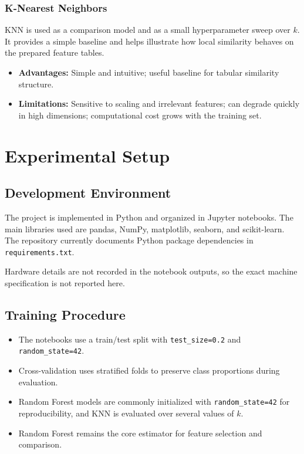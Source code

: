 \documentclass[11pt,a4paper]{article}
\begin{document}
\subsubsection{K-Nearest Neighbors}


KNN is used as a comparison model and as a small hyperparameter sweep over $k$. It provides a simple baseline and helps illustrate how local similarity behaves on the prepared feature tables.

\begin{itemize}[leftmargin=*]
    \item \textbf{Advantages:} Simple and intuitive; useful baseline for tabular similarity structure.
    \item \textbf{Limitations:} Sensitive to scaling and irrelevant features; can degrade quickly in high dimensions; computational cost grows with the training set.
\end{itemize}

\section{Experimental Setup}
\subsection{Development Environment}


The project is implemented in Python and organized in Jupyter notebooks. The main libraries used are pandas, NumPy, matplotlib, seaborn, and scikit-learn. The repository currently documents Python package dependencies in \texttt{requirements.txt}.

Hardware details are not recorded in the notebook outputs, so the exact machine specification is not reported here.

\subsection{Training Procedure}


\begin{itemize}
    \item The notebooks use a train/test split with \texttt{test\_size=0.2} and \texttt{random\_state=42}.
    \item Cross-validation uses stratified folds to preserve class proportions during evaluation.
    \item Random Forest models are commonly initialized with \texttt{random\_state=42} for reproducibility, and KNN is evaluated over several values of $k$.
    \item Random Forest remains the core estimator for feature selection and comparison.
\end{itemize}
\end{document}

